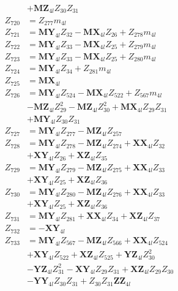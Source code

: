 \begin{multicols}{2}
\begin{align}
&+ \mathbf{MZ}_{4l}Z_{30}Z_{31} \nonumber \\
Z_{720} &= Z_{277}m_{4l} \nonumber \\
Z_{721} &= \mathbf{MY}_{4l}Z_{32} - \mathbf{MX}_{4l}Z_{26} + Z_{278}m_{4l} \nonumber \\
Z_{722} &= \mathbf{MY}_{4l}Z_{33} - \mathbf{MX}_{4l}Z_{25} + Z_{279}m_{4l} \nonumber \\
Z_{723} &= \mathbf{MY}_{4l}Z_{33} - \mathbf{MX}_{4l}Z_{25} + Z_{280}m_{4l} \nonumber \\
Z_{724} &= \mathbf{MY}_{4l}Z_{34} + Z_{281}m_{4l} \nonumber \\
Z_{725} &= \mathbf{MX}_{4l} \nonumber \\
Z_{726} &= \mathbf{MY}_{4l}Z_{524} - \mathbf{MX}_{4l}Z_{522} + Z_{567}m_{4l}  \nonumber \\
&- \mathbf{MZ}_{4l}Z_{29}^2 - \mathbf{MZ}_{4l}Z_{30}^2 + \mathbf{MX}_{4l}Z_{29}Z_{31}  \nonumber \\
&+ \mathbf{MY}_{4l}Z_{30}Z_{31} \nonumber \\
Z_{727} &= \mathbf{MY}_{4l}Z_{277} - \mathbf{MZ}_{4l}Z_{257} \nonumber \\
Z_{728} &= \mathbf{MY}_{4l}Z_{278} - \mathbf{MZ}_{4l}Z_{274} + \mathbf{XX}_{4l}Z_{32}  \nonumber \\
&+ \mathbf{XY}_{4l}Z_{26} + \mathbf{XZ}_{4l}Z_{35} \nonumber \\
Z_{729} &= \mathbf{MY}_{4l}Z_{279} - \mathbf{MZ}_{4l}Z_{275} + \mathbf{XX}_{4l}Z_{33}  \nonumber \\
&+ \mathbf{XY}_{4l}Z_{25} + \mathbf{XZ}_{4l}Z_{36} \nonumber \\
Z_{730} &= \mathbf{MY}_{4l}Z_{280} - \mathbf{MZ}_{4l}Z_{276} + \mathbf{XX}_{4l}Z_{33}  \nonumber \\
&+ \mathbf{XY}_{4l}Z_{25} + \mathbf{XZ}_{4l}Z_{36} \nonumber \\
Z_{731} &= \mathbf{MY}_{4l}Z_{281} + \mathbf{XX}_{4l}Z_{34} + \mathbf{XZ}_{4l}Z_{37} \nonumber \\
Z_{732} &= -\mathbf{XY}_{4l} \nonumber \\
Z_{733} &= \mathbf{MY}_{4l}Z_{567} - \mathbf{MZ}_{4l}Z_{566} + \mathbf{XX}_{4l}Z_{524}  \nonumber \\
&+ \mathbf{XY}_{4l}Z_{522} + \mathbf{XZ}_{4l}Z_{525} + \mathbf{YZ}_{4l}Z_{30}^2  \nonumber \\
&- \mathbf{YZ}_{4l}Z_{31}^2 - \mathbf{XY}_{4l}Z_{29}Z_{31} + \mathbf{XZ}_{4l}Z_{29}Z_{30}  \nonumber \\
&- \mathbf{YY}_{4l}Z_{30}Z_{31} + Z_{30}Z_{31}\mathbf{ZZ}_{4l} \nonumber \\

\end{align}
\end{multicols}
